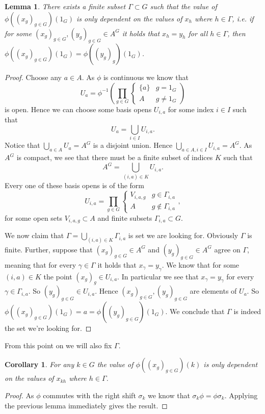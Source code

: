 \documentclass[titlepage, a4paper]{article}
\newtheorem{lemma}[theorem]{Lemma}
\newtheorem{corollary}[theorem]{Corollary}
\theoremstyle{remark}
\begin{document}
\begin{lemma}
	There exists a finite subset $\Gamma \subset G$ such that the value of $\phi((x_g)_{g \in G})(1_G)$ is only dependent on the values of $x_h$ where  $h \in \Gamma$, 
	i.e. if for some  $(x_g)_{g \in G}, (y_g)_{g \in G} \in A^{G}$ it holds that $x_h = y_h$ for all $h \in \Gamma$, then $\phi((x_g)_{g \in G})(1_G) = \phi((y_g)_g)(1_G)$.
\end{lemma}
\begin{proof}
	Choose any $a \in A$. As $\phi$ is continuous we know that \[
	U_a = \phi^{-1}\left( \prod_{g\in G} \begin{cases}
			\{a\} & g = 1_G\\
			A & g \ne 1_G
	\end{cases} \right)
\]
	is open. Hence we can choose some basis opens $U_{i, a}$ for some index $i \in I$ such that  \[
		U_a= \bigcup_{i \in I} U_{i,a}
	.\] 
	Notice that $\bigcup_{a \in A} U_a = A^{G}$ is a disjoint union. 
	Hence $\bigcup_{a \in A, i \in I} U_{i, a} = A^{G}$. 
	As $A^{G}$ is compact, we see that there must be a finite subset of indices $K$ such that \[
		A^{G} = \bigcup_{(i, a) \in K} U_{i, a}
	.\] 
	Every one of these basis opens is of the form \[
	U_{i,a} = \prod_{g \in G} \begin{cases}
		V_{i,a,g} & g \in \Gamma_{i,a}\\
		A & g \not\in \Gamma_{i,a}
	\end{cases}
	,\]
	for some open sets $V_{i,a,g} \subset A$ and finite subsets $\Gamma_{i,a} \subset G$. 

	We now claim that $\Gamma = \bigcup_{(i,a) \in K} \Gamma_{i,a}$ is set we are looking for. 
	Obviously $\Gamma$ is finite. 
	Further, suppose that $(x_g)_{g\in G} \in A^{G}$ and $(y_g)_{g \in G} \in A^{G}$ agree on $\Gamma$,
	meaning that for every $\gamma \in \Gamma$ it holds that  $x_\gamma = y_\gamma$.
	We know that for some  $(i, a) \in K$ the point $(x_g)_g \in U_{i,a}$. 
	In particular we see that $x_\gamma = y_\gamma$ for every $\gamma \in \Gamma_{i,a}$. 
	So $(y_g)_{g \in G} \in U_{i, a}$. 
	Hence  $(x_g)_{g \in G} , (y_g)_{g \in G}$ are elements of $U_a$. 
	So  $\phi((x_g)_{g \in G})(1_G) = a = \phi((y_g)_{g \in G})(1_G) $.
	We conclude that $\Gamma$ is indeed the set we're looking for.
\end{proof}
From this point on we will also fix $\Gamma$. 

\begin{corollary}
	For any $k \in G$ the value of $\phi((x_g)_{g \in G})(k)$ is only dependent on the values of $x_{kh}$ where $h \in \Gamma$.
\end{corollary}	
\begin{proof}
	As $\phi$ commutes with the right shift  $\sigma_k$ we know that $\sigma_k\phi = \phi\sigma_k$. Applying the previous lemma immediately gives the result.
\end{proof}
\end{document}

